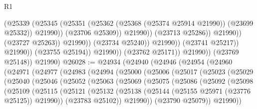 \begin{lexlean}{R1}
\begin{coremodule}
                                                (@25339
                                                  (@25345
                                                    (@25351
                                                      (@25362
                                                        (@25368 (@25374 @25914 @21990))
                                                        (@23699 @25332))
                                                      @21990))
                                                  (@23706 @25309))
                                                @21990))
                                            (@23713 @25286))
                                          @21990))
                                      (@23727 @25263))
                                    @21990))
                                (@23734 @25240))
                              @21990))
                          (@23741 @25217))
                        @21990))
                    (@23755 @25194))
                  @21990))
              (@23762 @25171))
            @21990))
        (@23769 @25148))
      @21990)
@26028 := @24934
    (@24940
      (@24946
        (@24954
          (@24960
            (@24971
              (@24977
                (@24983
                  (@24994
                    (@25000
                      (@25006
                        (@25017
                          (@25023
                            (@25029
                              (@25040
                                (@25046
                                  (@25052
                                    (@25063
                                      (@25069
                                        (@25075
                                          (@25086
                                            (@25092
                                              (@25098
                                                (@25109
                                                  (@25115
                                                    (@25121
                                                      (@25132
                                                        (@25138
                                                          (@25144
                                                            (@25155 @25971 (@23776 @25125))
                                                            @21990))
                                                        (@23783 @25102))
                                                      @21990))
                                                  (@23790 @25079))
                                                @21990))

\end{coremodule}
\end{lexlean}
